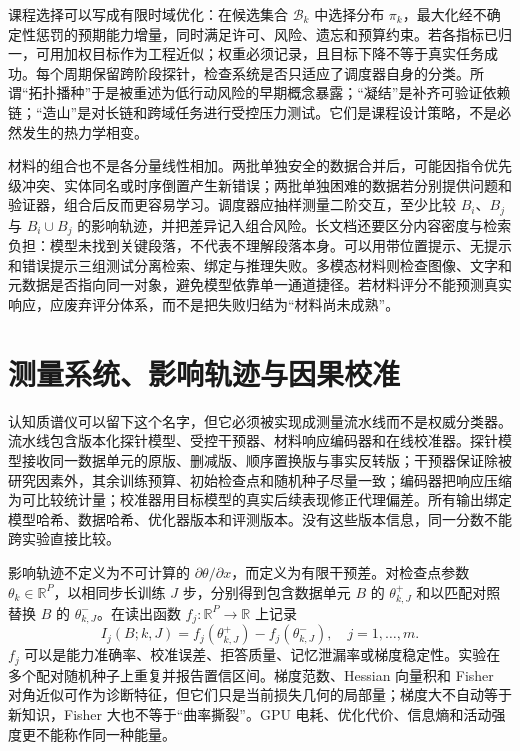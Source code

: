 课程选择可以写成有限时域优化：在候选集合 $\mathcal B_k$ 中选择分布 $\pi_k$，最大化经不确定性惩罚的预期能力增量，同时满足许可、风险、遗忘和预算约束。若各指标已归一，可用加权目标作为工程近似；权重必须记录，且目标下降不等于真实任务成功。每个周期保留跨阶段探针，检查系统是否只适应了调度器自身的分类。所谓“拓扑播种”于是被重述为低行动风险的早期概念暴露；“凝结”是补齐可验证依赖链；“造山”是对长链和跨域任务进行受控压力测试。它们是课程设计策略，不是必然发生的热力学相变。

材料的组合也不是各分量线性相加。两批单独安全的数据合并后，可能因指令优先级冲突、实体同名或时序倒置产生新错误；两批单独困难的数据若分别提供问题和验证器，组合后反而更容易学习。调度器应抽样测量二阶交互，至少比较 $B_i$、$B_j$ 与 $B_i\cup B_j$ 的影响轨迹，并把差异记入组合风险。长文档还要区分内容密度与检索负担：模型未找到关键段落，不代表不理解段落本身。可以用带位置提示、无提示和错误提示三组测试分离检索、绑定与推理失败。多模态材料则检查图像、文字和元数据是否指向同一对象，避免模型依靠单一通道捷径。若材料评分不能预测真实响应，应废弃评分体系，而不是把失败归结为“材料尚未成熟”。

\section{测量系统、影响轨迹与因果校准}
\label{sec:cognitive_mass_spectrometer_engineering}

认知质谱仪可以留下这个名字，但它必须被实现成测量流水线而不是权威分类器。流水线包含版本化探针模型、受控干预器、材料响应编码器和在线校准器。探针模型接收同一数据单元的原版、删减版、顺序置换版与事实反转版；干预器保证除被研究因素外，其余训练预算、初始检查点和随机种子尽量一致；编码器把响应压缩为可比较统计量；校准器用目标模型的真实后续表现修正代理偏差。所有输出绑定模型哈希、数据哈希、优化器版本和评测版本。没有这些版本信息，同一分数不能跨实验直接比较。

影响轨迹不定义为不可计算的 $\partial\theta/\partial x$，而定义为有限干预差。对检查点参数 $\theta_k\in\mathbb R^P$，以相同步长训练 $J$ 步，分别得到包含数据单元 $B$ 的 $\theta^{+}_{k,J}$ 和以匹配对照替换 $B$ 的 $\theta^{-}_{k,J}$。在读出函数 $f_j:\mathbb R^P\to\mathbb R$ 上记录
\begin{equation}
I_j(B;k,J)=f_j(\theta^{+}_{k,J})-f_j(\theta^{-}_{k,J}),\quad j=1,\ldots,m .
\end{equation}
$f_j$ 可以是能力准确率、校准误差、拒答质量、记忆泄漏率或梯度稳定性。实验在多个配对随机种子上重复并报告置信区间。梯度范数、Hessian 向量积和 Fisher 对角近似可作为诊断特征，但它们只是当前损失几何的局部量；梯度大不自动等于新知识，Fisher 大也不等于“曲率撕裂”。GPU 电耗、优化代价、信息熵和活动强度更不能称作同一种能量。


